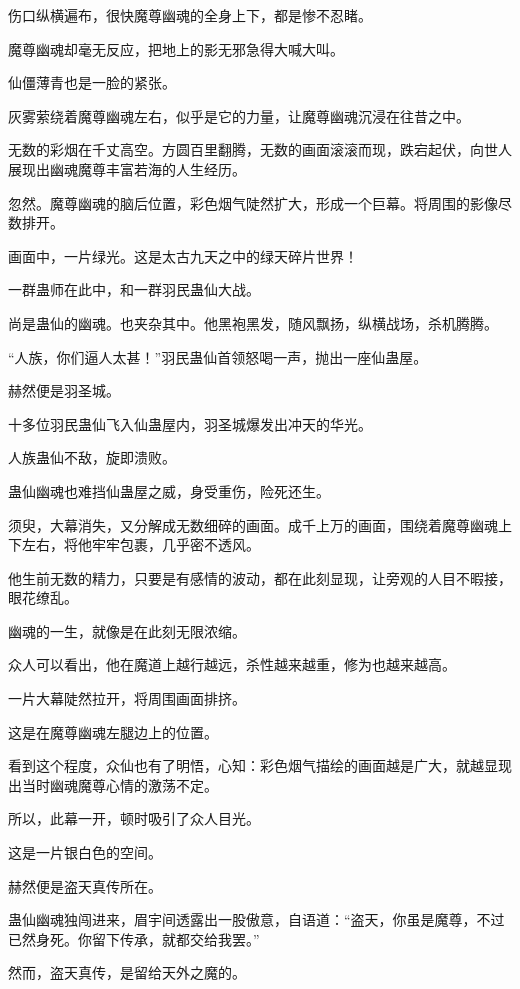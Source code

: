 \begin{this_body}
伤口纵横遍布，很快魔尊幽魂的全身上下，都是惨不忍睹。

魔尊幽魂却毫无反应，把地上的影无邪急得大喊大叫。

仙僵薄青也是一脸的紧张。

灰雾萦绕着魔尊幽魂左右，似乎是它的力量，让魔尊幽魂沉浸在往昔之中。

无数的彩烟在千丈高空。方圆百里翻腾，无数的画面滚滚而现，跌宕起伏，向世人展现出幽魂魔尊丰富若海的人生经历。

忽然。魔尊幽魂的脑后位置，彩色烟气陡然扩大，形成一个巨幕。将周围的影像尽数排开。

画面中，一片绿光。这是太古九天之中的绿天碎片世界！

一群蛊师在此中，和一群羽民蛊仙大战。

尚是蛊仙的幽魂。也夹杂其中。他黑袍黑发，随风飘扬，纵横战场，杀机腾腾。

“人族，你们逼人太甚！”羽民蛊仙首领怒喝一声，抛出一座仙蛊屋。

赫然便是羽圣城。

十多位羽民蛊仙飞入仙蛊屋内，羽圣城爆发出冲天的华光。

人族蛊仙不敌，旋即溃败。

蛊仙幽魂也难挡仙蛊屋之威，身受重伤，险死还生。

须臾，大幕消失，又分解成无数细碎的画面。成千上万的画面，围绕着魔尊幽魂上下左右，将他牢牢包裹，几乎密不透风。

他生前无数的精力，只要是有感情的波动，都在此刻显现，让旁观的人目不暇接，眼花缭乱。

幽魂的一生，就像是在此刻无限浓缩。

众人可以看出，他在魔道上越行越远，杀性越来越重，修为也越来越高。

一片大幕陡然拉开，将周围画面排挤。

这是在魔尊幽魂左腿边上的位置。

看到这个程度，众仙也有了明悟，心知：彩色烟气描绘的画面越是广大，就越显现出当时幽魂魔尊心情的激荡不定。

所以，此幕一开，顿时吸引了众人目光。

这是一片银白色的空间。

赫然便是盗天真传所在。

蛊仙幽魂独闯进来，眉宇间透露出一股傲意，自语道：“盗天，你虽是魔尊，不过已然身死。你留下传承，就都交给我罢。”

然而，盗天真传，是留给天外之魔的。


\end{this_body}
